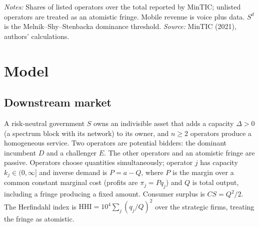 \documentclass[12pt,a4paper]{article}
\theoremstyle{definition}
\theoremstyle{remark}
\begin{document}
\begin{table}[!htbp]
\centering\small
\caption{Market structure in Colombia, 4Q-2020}\label{tab:market}

\par\vspace{2pt}\footnotesize\textit{Notes:} Shares of listed operators over the total reported by MinTIC; unlisted operators are treated as an atomistic fringe. Mobile revenue is voice plus data. $S^d$ is the Melnik--Shy--Stenbacka dominance threshold. \textit{Source:} MinTIC (2021), authors' calculations.
\end{table}

\section{Model}\label{sec:model}

\subsection{Downstream market}

A risk-neutral government $S$ owns an indivisible asset that adds a capacity $\Delta>0$ (a spectrum block with its network) to its owner, and $n\ge 2$ operators produce a homogeneous service. Two operators are potential bidders: the dominant incumbent $D$ and a challenger $E$. The other operators and an atomistic fringe are passive. Operators choose quantities simultaneously; operator $j$ has capacity $k_j\in(0,\infty]$ and inverse demand is $P=a-Q$, where $P$ is the margin over a common constant marginal cost (profits are $\pi_j=Pq_j$) and $Q$ is total output, including a fringe producing a fixed amount. Consumer surplus is $CS=Q^2/2$. The Herfindahl index is $\mathrm{HHI}=10^4\sum_j(q_j/Q)^2$ over the strategic firms, treating the fringe as atomistic.
\end{document}
